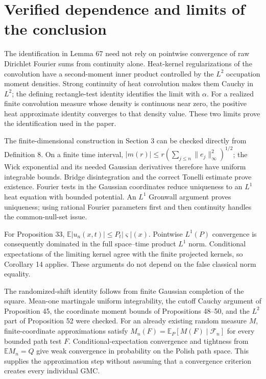 \documentclass[10pt]{article}
\begin{document}
\section*{Verified dependence and limits of the conclusion}
The identification in Lemma 67 need not rely on pointwise convergence of raw Dirichlet Fourier sums from continuity alone. Heat-kernel regularizations of the convolution have a second-moment inner product controlled by the \(L^2\) occupation moment densities. Strong continuity of heat convolution makes them Cauchy in \(L^2\); the defining rectangle-test identity identifies the limit with \(\alpha\). For a realized finite convolution measure whose density is continuous near zero, the positive heat approximate identity converges to that density value. These two limits prove the identification used in the paper.\par
The finite-dimensional construction in Section 3 can be checked directly from Definition 8. On a finite time interval, \(|m(r)|\le r(\sum_{j\le n}\|e_j\|_\infty^2)^{1/2}\); the Wick exponential and its needed Gaussian derivatives therefore have uniform integrable bounds. Bridge disintegration and the correct Tonelli estimate prove existence. Fourier tests in the Gaussian coordinates reduce uniqueness to an \(L^1\) heat equation with bounded potential. An \(L^1\) Gronwall argument proves uniqueness; using rational Fourier parameters first and then continuity handles the common-null-set issue.\par
For Proposition 33, \(\mathbb E|u_n(x,t)|\le P_t|\varsigma|(x)\). Pointwise \(L^1(P)\) convergence is consequently dominated in the full space–time product \(L^1\) norm. Conditional expectations of the limiting kernel agree with the finite projected kernels, so Corollary 14 applies. These arguments do not depend on the false classical norm equality.\par
The randomized-shift identity follows from finite Gaussian completion of the square. Mean-one martingale uniform integrability, the cutoff Cauchy argument of Proposition 45, the coordinate moment bounds of Propositions 48–50, and the \(L^2\) part of Proposition 52 were checked. For an already existing random measure \(M\), finite-coordinate approximations satisfy \(M_n(F)=\mathbb E_P[M(F)\mid\mathcal F_n]\) for every bounded path test \(F\). Conditional-expectation convergence and tightness from \(\mathbb EM_n=Q\) give weak convergence in probability on the Polish path space. This supplies the approximation step without assuming that a convergence criterion creates every individual GMC.\par
\end{document}
